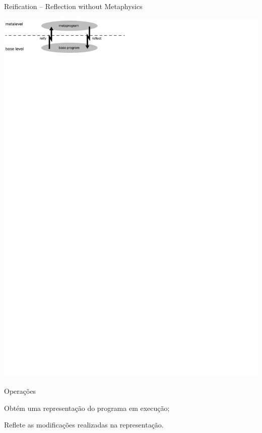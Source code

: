 \documentclass[12pt,t]{beamer}
\begin{document}
	 \begin{frame}{Reification -- Reflection without Metaphysics \cite{friedman1984reification}}
	 	\begin{block}{ }
 	 		\centering
 	 		\includegraphics[trim=0 755 310 0, clip=true]{wand.pdf}
	 	\end{block}
	 	\begin{block}{Operações}
	 	\begin{description}[reificação]
	 				\item [reificação] Obtém uma representação do programa em execução;
	 				\item [reflexão] Reflete as modificações realizadas na representação.
	 			\end{description}
	 	\end{block}
	 \end{frame}	  	 
\end{document}
